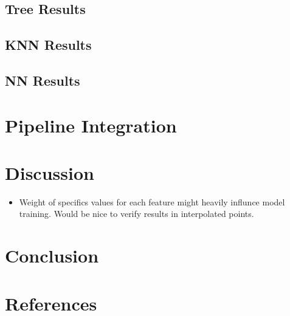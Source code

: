 \documentclass[12pt,letterpaper]{article}
\begin{document}
\subsection{Tree Results}
\subsection{KNN Results}
\subsection{NN Results}
\section{Pipeline Integration}
\section{Discussion}
\begin{itemize}
    \item Weight of specifics values for each feature might heavily influnce model training. Would be nice to verify results in interpolated points.
\end{itemize}
\section{Conclusion}
\section{References}
\end{document}
